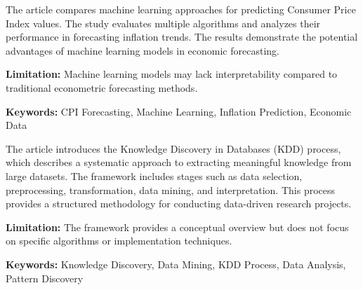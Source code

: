 {
	The article \cite{Nalici2025} compares machine learning approaches for predicting Consumer Price Index values. The study evaluates multiple algorithms and analyzes their performance in forecasting inflation trends. The results demonstrate the potential advantages of machine learning models in economic forecasting.
	
	\bigskip
	
	\textbf{Limitation:} Machine learning models may lack interpretability compared to traditional econometric forecasting methods.
	
	\scriptsize{\textbf{Keywords:} CPI Forecasting, Machine Learning, Inflation Prediction, Economic Data}
}

{
	The article \cite{Fayyad:1996} introduces the Knowledge Discovery in Databases (KDD) process, which describes a systematic approach to extracting meaningful knowledge from large datasets. The framework includes stages such as data selection, preprocessing, transformation, data mining, and interpretation. This process provides a structured methodology for conducting data-driven research projects.
	
	\bigskip
	
	\textbf{Limitation:} The framework provides a conceptual overview but does not focus on specific algorithms or implementation techniques.
	
	\scriptsize{\textbf{Keywords:} Knowledge Discovery, Data Mining, KDD Process, Data Analysis, Pattern Discovery}
}


